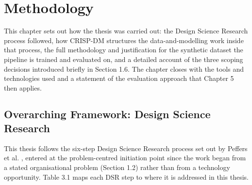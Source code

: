 \hypertarget{methodology}{%
\chapter{Methodology}\label{methodology}}

This chapter sets out how the thesis was carried out: the Design Science
Research process followed, how CRISP-DM structures the
data-and-modelling work inside that process, the full methodology and
justification for the synthetic dataset the pipeline is trained and
evaluated on, and a detailed account of the three scoping decisions
introduced briefly in Section 1.6. The chapter closes with the tools and
technologies used and a statement of the evaluation approach that
Chapter 5 then applies.

\hypertarget{overarching-framework-design-science-research}{%
\section{Overarching Framework: Design Science
Research}\label{overarching-framework-design-science-research}}

This thesis follows the six-step Design Science Research process set out
by Peffers et al. \citep{peffers2007design}, entered at the
problem-centred initiation point since the work began from a stated
organisational problem (Section 1.2) rather than from a technology
opportunity. Table 3.1 maps each DSR step to where it is addressed in
this thesis.

